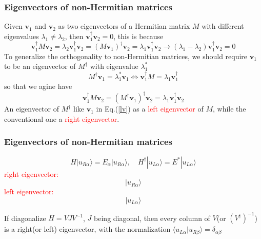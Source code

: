 \documentclass{beamer}
\begin{document}
\begin{frame}
\frametitle{Eigenvectors of non-Hermitian matrices}
Given $\mathbf{v}_1$ and $\mathbf{v}_2$ as two eigenvectors of a Hermitian matrix $M$ with different eigenvalues $\lambda_1\neq\lambda_2$, then $\mathbf{v}_1^\dagger\mathbf{v}_2=0$, this is because
\begin{equation}
\mathbf{v}_1^\dagger M\mathbf{v}_2=\lambda_2\mathbf{v}_1^\dagger\mathbf{v}_2=(M\mathbf{v}_1)^\dagger\mathbf{v}_2=\lambda_1\mathbf{v}_1^\dagger\mathbf{v}_2\rightarrow(\lambda_1-\lambda_2)\mathbf{v}_1^\dagger\mathbf{v}_2=0
\end{equation}
To generalize the orthogonality to non-Hermitian matrices, we should require $\mathbf{v}_1$ to be an eigenvector of $M^\dagger$ with eigenvalue $\lambda_1^*$
\begin{equation}
M^\dagger\mathbf{v}_1=\lambda_1^*\mathbf{v}_1\Leftrightarrow\mathbf{v}_1^\dagger M=\lambda_1\mathbf{v}_1^\dagger\label{lv}
\end{equation}
so that we agine have 
\begin{equation}
\mathbf{v}_1^\dagger M\mathbf{v}_2=(M^\dagger\mathbf{v}_1)^\dagger\mathbf{v}_2=\lambda_1\mathbf{v}_1^\dagger\mathbf{v}_2
\end{equation}
An eigenvector of $M^\dagger$ like $\mathbf{v}_1$ in Eq.(\ref{lv}) as a \textcolor{red}{left eigenvector} of $M$, while the conventional one a \textcolor{red}{right eigenvector}.
\end{frame}
\begin{frame}
\frametitle{Eigenvectors of non-Hermitian matrices}
\begin{equation}
H|u_{R\alpha}\rangle=E_\alpha|u_{R\alpha}\rangle,\quad H^\dagger|u_{L\alpha}\rangle=E^*|u_{L\alpha}\rangle
\end{equation}
\textcolor{red}{right eigenvector:}
$$|u_{R\alpha}\rangle$$
\textcolor{red}{left eigenvector:}
$$|u_{L\alpha}\rangle$$
\begin{block}{}
If diagonalize $H=VJV^{-1}$, $J$ being diagonal, then every column of $V$(or $(V^\dagger)^{-1}$) is a right(or left) eigenvector, with the normalization $\langle u_{L\alpha}|u_{R\beta}\rangle=\delta_{\alpha\beta}$
\end{block}
\end{frame}
\end{document}
